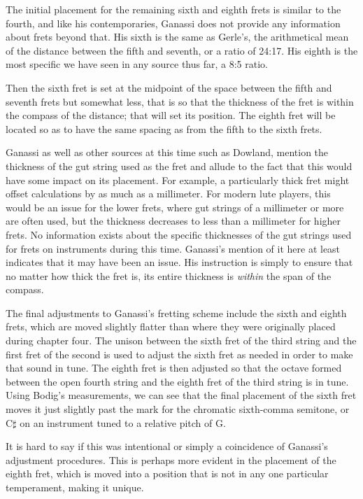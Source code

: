 The initial placement for the remaining sixth and eighth frets is similar to the
fourth, and like his contemporaries, Ganassi does not provide any information
about frets beyond that.  His sixth is the same as Gerle's, the arithmetical
mean of the distance between the fifth and seventh, or a ratio of 24:17.  His
eighth is the most specific we have seen in any source thus far, a 8:5 ratio.
\begin{blocks}
Then the sixth fret is set at the midpoint of the space between the fifth and seventh
frets but somewhat less, that is so that the thickness of the fret is within the
compass of the distance; that will set its position.  The eighth fret will be located
so as to have the same spacing as from the fifth to the sixth frets.
\end{blocks}
Ganassi as well as other sources at this time such as Dowland, mention the thickness
of the gut string used as the fret and allude to the fact that this would have
some impact on its placement.  For example, a particularly thick fret might offset
calculations by as much as a millimeter.  For modern lute players, this would be an
issue for the lower frets, where gut strings of a millimeter or more are often used, but
the thickness decreases to less than a millimeter for higher frets. No
information exists about the specific thicknesses of the gut strings used for frets on
instruments during this time.  Ganassi's mention of it here at least indicates that it
may have been an issue.  His instruction is simply to ensure that no matter how thick
the fret is, its entire thickness is \textit{within} the span of the compass.

The final adjustments to Ganassi's fretting scheme include the sixth and eighth frets,
which are moved slightly flatter than where they were originally placed during chapter
four. The unison between the sixth fret of the third string and the first fret of the
second is used to adjust the sixth fret as needed in order to make that sound in tune.  The
eighth fret is then adjusted so that the octave formed between the open fourth string
and the eighth fret of the third string is in tune.  Using Bodig's measurements, we can
see that the final placement of the sixth fret moves it just slightly past the mark for
the chromatic sixth-comma semitone, or C$\sharp$ on an instrument tuned to a relative
pitch of G.

It is hard to say if this was intentional or simply a coincidence of Ganassi's
adjustment procedures.  This is perhaps more evident in the placement of the
eighth fret, which is moved into a position that is not in any one particular
temperament, making it unique.


